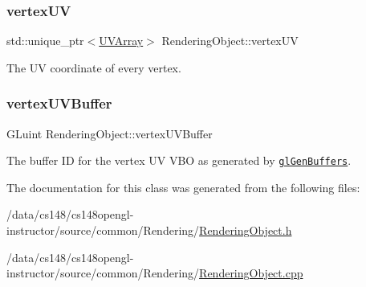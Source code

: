 \hypertarget{class_rendering_object_afc405316bddec4ba1d5c228ecc0d9061}{}\label{class_rendering_object_afc405316bddec4ba1d5c228ecc0d9061} 
\subsubsection{\texorpdfstring{vertex\+UV}{vertexUV}}
{\footnotesize\ttfamily std\+::unique\+\_\+ptr$<$\hyperlink{class_rendering_object_a504ecd45ebe36dfa5b78c46d64d9904a}{U\+V\+Array}$>$ Rendering\+Object\+::vertex\+UV\hspace{0.3cm}{\ttfamily [protected]}}



The UV coordinate of every vertex. 

\hypertarget{class_rendering_object_ad583c70014e3f6ab0c9b62ea3c96ad25}{}\label{class_rendering_object_ad583c70014e3f6ab0c9b62ea3c96ad25} 
\subsubsection{\texorpdfstring{vertex\+U\+V\+Buffer}{vertexUVBuffer}}
{\footnotesize\ttfamily G\+Luint Rendering\+Object\+::vertex\+U\+V\+Buffer\hspace{0.3cm}{\ttfamily [protected]}}



The buffer ID for the vertex UV V\+BO as generated by \href{https://www.opengl.org/sdk/docs/man/html/glGenBuffers.xhtml}{\tt gl\+Gen\+Buffers}. 



The documentation for this class was generated from the following files\+:\begin{DoxyCompactItemize}
\item 
/data/cs148/cs148opengl-\/instructor/source/common/\+Rendering/\hyperlink{_rendering_object_8h}{Rendering\+Object.\+h}\item 
/data/cs148/cs148opengl-\/instructor/source/common/\+Rendering/\hyperlink{_rendering_object_8cpp}{Rendering\+Object.\+cpp}\end{DoxyCompactItemize}
